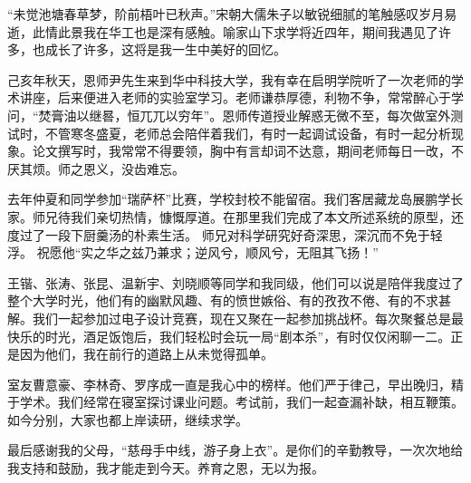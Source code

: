 \documentclass[supercite]{HustGraduPaper}
\begin{document}
\begin{thankpage}
	
	“未觉池塘春草梦，阶前梧叶已秋声。”宋朝大儒朱子以敏锐细腻的笔触感叹岁月易逝，此情此景我在华工也是深有感触。喻家山下求学将近四年，期间我遇见了许多，也成长了许多，这将是我一生中美好的回忆。

	己亥年秋天，恩师尹先生来到华中科技大学，我有幸在启明学院听了一次老师的学术讲座，后来便进入老师的实验室学习。老师谦恭厚德，利物不争，常常醉心于学问，“焚膏油以继晷，恒兀兀以穷年”。恩师传道授业解惑无微不至，每次做室外测试时，不管寒冬盛夏，老师总会陪伴着我们，有时一起调试设备，有时一起分析现象。论文撰写时，我常常不得要领，胸中有言却词不达意，期间老师每日一改，不厌其烦。师之恩义，没齿难忘。

	去年仲夏和同学参加“瑞萨杯”比赛，学校封校不能留宿。我们客居藏龙岛展鹏学长家。师兄待我们亲切热情，慷慨厚道。在那里我们完成了本文所述系统的原型，还度过了一段下厨羹汤的朴素生活。
	师兄对科学研究好奇深思，深沉而不免于轻浮。
	祝愿他“实之华之兹乃兼求；逆风兮，顺风兮，无阻其飞扬！”

	王锴、张涛、张昆、温新宇、刘晓顺等同学和我同级，他们可以说是陪伴我度过了整个大学时光，他们有的幽默风趣、有的愤世嫉俗、有的孜孜不倦、有的不求甚解。我们一起参加过电子设计竞赛，现在又聚在一起参加挑战杯。每次聚餐总是最快乐的时光，酒足饭饱后，我们轻松时会玩一局“剧本杀”，有时仅仅闲聊一二。正是因为他们，我在前行的道路上从未觉得孤单。

	室友曹意豪、李林奇、罗序成一直是我心中的榜样。他们严于律己，早出晚归，精于学术。我们经常在寝室探讨课业问题。考试前，我们一起查漏补缺，相互鞭策。如今分别，大家也都上岸读研，继续求学。

	最后感谢我的父母，“慈母手中线，游子身上衣”。是你们的辛勤教导，一次次地给我支持和鼓励，我才能走到今天。养育之恩，无以为报。


	





\end{thankpage}
\end{document}

